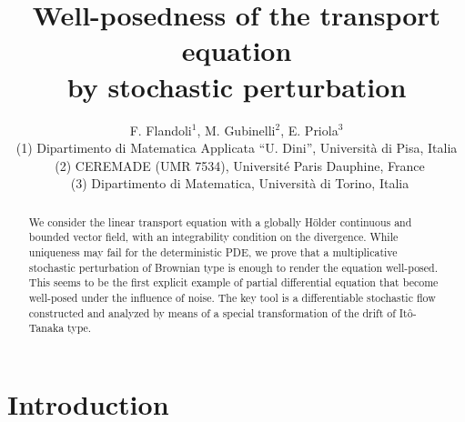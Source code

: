 \documentclass[a4paper,11pt]{article}
\begin{document}
\title{Well-posedness of the transport equation\\
by stochastic perturbation }
\author{F. Flandoli$^{1}$, M. Gubinelli$^{2}$, E. Priola$^{3}$ \\
{\small {(1) Dipartimento di Matematica Applicata ``U. Dini'', Universit\`a
di Pisa, Italia}}\\
{\small {\ (2) CEREMADE (UMR 7534), Universit\'e Paris Dauphine, France}}\\
{\small {\ (3) Dipartimento di Matematica, Universit\`a di Torino, Italia }}}
\maketitle

\begin{abstract}
We consider the linear transport equation with a globally H\"{o}lder
continuous and bounded vector field, with an integrability condition on the
divergence. While uniqueness may fail for the deterministic PDE, we prove
that a multiplicative stochastic perturbation of Brownian type is enough to
render the equation well-posed. This seems to be the first explicit example
of partial differential equation that become well-posed under the influence
of noise. The key tool is a differentiable stochastic flow constructed and
analyzed by means of a special transformation of the drift of It\^{o}-Tanaka
type.
\end{abstract}

\section{Introduction}
\end{document}
